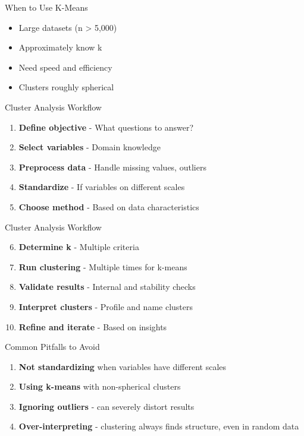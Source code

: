 \documentclass[aspectratio=169,ignorenonframetext]{beamer}
\begin{document}
\begin{frame}{When to Use K-Means}
\begin{itemize}
\item
  Large datasets (n \textgreater{} 5,000)
\item
  Approximately know k
\item
  Need speed and efficiency
\item
  Clusters roughly spherical
\end{itemize}
\end{frame}

\begin{frame}{Cluster Analysis Workflow}
\begin{enumerate}
\item
  \textbf{Define objective} - What questions to answer?
\item
  \textbf{Select variables} - Domain knowledge
\item
  \textbf{Preprocess data} - Handle missing values, outliers
\item
  \textbf{Standardize} - If variables on different scales
\item
  \textbf{Choose method} - Based on data characteristics
\end{enumerate}
\end{frame}

\begin{frame}{Cluster Analysis Workflow}
\begin{enumerate}
\setcounter{enumi}{5}
\item
  \textbf{Determine k} - Multiple criteria
\item
  \textbf{Run clustering} - Multiple times for k-means
\item
  \textbf{Validate results} - Internal and stability checks
\item
  \textbf{Interpret clusters} - Profile and name clusters
\item
  \textbf{Refine and iterate} - Based on insights
\end{enumerate}
\end{frame}

\begin{frame}{Common Pitfalls to Avoid}
\begin{enumerate}
\item
  \textbf{Not standardizing} when variables have different scales
\item
  \textbf{Using k-means} with non-spherical clusters
\item
  \textbf{Ignoring outliers} - can severely distort results
\item
  \textbf{Over-interpreting} - clustering always finds structure, even
  in random data
\end{enumerate}
\end{frame}
\end{document}
